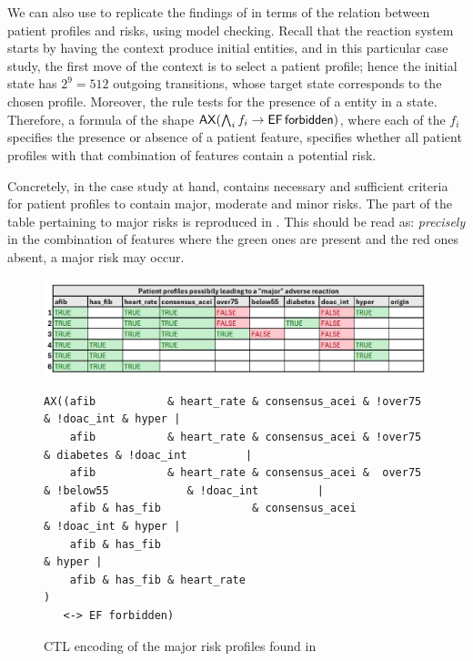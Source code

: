\medskip\noindent We can also use \GROOVE to replicate the findings of \cite[Fig.~6]{DBLP:conf/cmsb/BowlesBBFGM24} in terms of the relation between patient profiles and risks, using model checking. Recall that the reaction system starts by having the context produce initial entities, and in this particular case study, the first move of the context is to select a patient profile; hence the initial state has $2^9=512$ outgoing transitions, whose target state corresponds to the chosen profile. Moreover, the rule \forbidden tests for the presence of a \Forbidden entity in a state. Therefore, a formula of the shape
$\mathop{\mathsf{AX}}(\bigwedge_i f_i \rightarrow \mathop{\mathsf{EF}} {\text{\sffamily forbidden}})$, where each of the $f_i$ specifies the presence or absence of a patient feature, specifies whether all patient profiles with that combination of features contain a potential risk.

Concretely, in the case study at hand, \cite[Fig.~6]{DBLP:conf/cmsb/BowlesBBFGM24} contains necessary and sufficient criteria for patient profiles to contain major, moderate and minor risks. The part of the table pertaining to major risks is reproduced in . This should be read as: \emph{precisely} in the combination of features where the green ones are present and the red ones absent, a major risk may occur.
%
\begin{figure}
\centering
\includegraphics[scale=.4]{./figs/table-from-cmsb2024}\begin{lstlisting}[basicstyle=\ttfamily\small,xleftmargin=0cm]
AX((afib           & heart_rate & consensus_acei & !over75                       & !doac_int & hyper |
    afib           & heart_rate & consensus_acei & !over75            & diabetes & !doac_int         |
    afib           & heart_rate & consensus_acei &  over75 & !below55            & !doac_int         |
    afib & has_fib              & consensus_acei                                 & !doac_int & hyper |
    afib & has_fib                                                                           & hyper |
    afib & has_fib & heart_rate                                                                      )
   <-> EF forbidden)
\end{lstlisting}
\caption{CTL encoding of the major risk profiles found in \cite[Fig.~6]{DBLP:conf/cmsb/BowlesBBFGM24}}
\label{fig:table-from-cmsb2024}
\end{figure}

